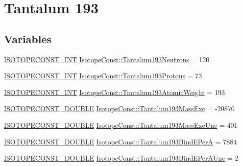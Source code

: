 \hypertarget{group___isotope_const-_tantalum-_ta193}{}\section{Tantalum 193}
\label{group___isotope_const-_tantalum-_ta193}
\subsection*{Variables}
\begin{DoxyCompactItemize}
\item 
\mbox{\hyperlink{group___isotope_const-_macros_ga5f18360b3e99483a35c32d789e62621c}{I\+S\+O\+T\+O\+P\+E\+C\+O\+N\+S\+T\+\_\+\+I\+NT}} \mbox{\hyperlink{group___isotope_const-_tantalum-_ta193_ga6907e37eb745cb922c09127ca017d171}{Isotope\+Const\+::\+Tantalum193\+Neutrons}} = 120
\item 
\mbox{\hyperlink{group___isotope_const-_macros_ga5f18360b3e99483a35c32d789e62621c}{I\+S\+O\+T\+O\+P\+E\+C\+O\+N\+S\+T\+\_\+\+I\+NT}} \mbox{\hyperlink{group___isotope_const-_tantalum-_ta193_gab5657f4fa3ce4bb6ad0ca37e8eecfa93}{Isotope\+Const\+::\+Tantalum193\+Protons}} = 73
\item 
\mbox{\hyperlink{group___isotope_const-_macros_ga5f18360b3e99483a35c32d789e62621c}{I\+S\+O\+T\+O\+P\+E\+C\+O\+N\+S\+T\+\_\+\+I\+NT}} \mbox{\hyperlink{group___isotope_const-_tantalum-_ta193_gab11300c17872c76bc4e9cc7c91477cfe}{Isotope\+Const\+::\+Tantalum193\+Atomic\+Weight}} = 193
\item 
\mbox{\hyperlink{group___isotope_const-_macros_ga8f45a7272ce02c0b4c65c44636ed719a}{I\+S\+O\+T\+O\+P\+E\+C\+O\+N\+S\+T\+\_\+\+D\+O\+U\+B\+LE}} \mbox{\hyperlink{group___isotope_const-_tantalum-_ta193_ga14d03683e1adb476217ac7c330fbb08c}{Isotope\+Const\+::\+Tantalum193\+Mass\+Exc}} = -\/20870
\item 
\mbox{\hyperlink{group___isotope_const-_macros_ga8f45a7272ce02c0b4c65c44636ed719a}{I\+S\+O\+T\+O\+P\+E\+C\+O\+N\+S\+T\+\_\+\+D\+O\+U\+B\+LE}} \mbox{\hyperlink{group___isotope_const-_tantalum-_ta193_gaaf7c0c4560ad1770c2ac8770f8c6031c}{Isotope\+Const\+::\+Tantalum193\+Mass\+Exc\+Unc}} = 401
\item 
\mbox{\hyperlink{group___isotope_const-_macros_ga8f45a7272ce02c0b4c65c44636ed719a}{I\+S\+O\+T\+O\+P\+E\+C\+O\+N\+S\+T\+\_\+\+D\+O\+U\+B\+LE}} \mbox{\hyperlink{group___isotope_const-_tantalum-_ta193_gaef5473a424f5d248668498d13efa47f5}{Isotope\+Const\+::\+Tantalum193\+Bind\+E\+PerA}} = 7884
\item 
\mbox{\hyperlink{group___isotope_const-_macros_ga8f45a7272ce02c0b4c65c44636ed719a}{I\+S\+O\+T\+O\+P\+E\+C\+O\+N\+S\+T\+\_\+\+D\+O\+U\+B\+LE}} \mbox{\hyperlink{group___isotope_const-_tantalum-_ta193_ga53789b7c27f6081f362dc27e270db490}{Isotope\+Const\+::\+Tantalum193\+Bind\+E\+Per\+A\+Unc}} = 2

\end{DoxyCompactItemize}

